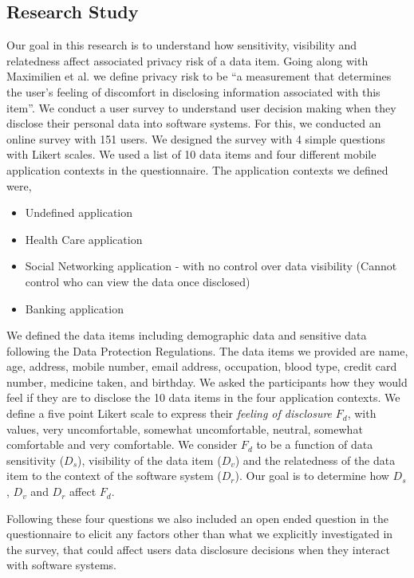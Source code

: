 \documentclass[conference]{IEEEtran}
\begin{document}
\subsection {Research Study}

Our goal in this research is to understand how sensitivity, visibility and relatedness affect associated privacy risk of a data item. Going along with Maximilien et al. \cite {maximilien2009privacy} we define privacy risk to be \enquote{a measurement that determines the user's feeling of discomfort in disclosing information associated with this item}. We conduct a user survey to understand user decision making when they disclose their personal data into software systems. For this, we conducted an online survey with 151 users. We designed the survey with 4 simple questions with Likert scales. We used a list of 10 data items and four different mobile application contexts in the questionnaire. The application contexts we defined were,

\begin{itemize}
\item Undefined application
\item Health Care application
\item Social Networking application - with no control over data visibility (Cannot control who can view the data once disclosed)
\item Banking application
\end{itemize}

We defined the data items including demographic data and sensitive data following the Data Protection Regulations. The data items we provided are name, age, address, mobile number, email address, occupation, blood type, credit card number, medicine taken, and birthday. We asked the participants how they would feel if they are to disclose the 10 data items in the four application contexts. We define a five point Likert scale to express their \textit{feeling of disclosure} $F_d$, with values, very uncomfortable, somewhat uncomfortable, neutral, somewhat comfortable and very comfortable. We consider $F_d$ to be a function of data sensitivity ($D_s$), visibility of the data item ($D_v$) and the relatedness of the data item to the context of the software system ($D_r$). Our goal is to determine how $D_s$, $D_v$ and $D_r$ affect $F_d$.

Following these four questions we also included an open ended question in the questionnaire to elicit any factors other than what we explicitly investigated in the survey, that could affect users data disclosure decisions when they interact with software systems. 
\end{document}
